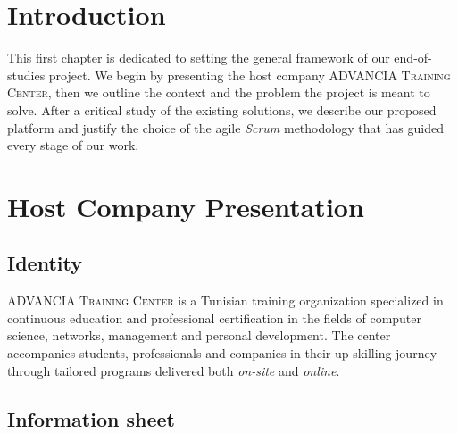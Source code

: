 

\section{Introduction}

This first chapter is dedicated to setting the general framework of our end-of-studies project. We begin by presenting the host company \textsc{ADVANCIA Training Center}, then we outline the context and the problem the project is meant to solve. After a critical study of the existing solutions, we describe our proposed platform and justify the choice of the agile \textit{Scrum} methodology that has guided every stage of our work.

\section{Host Company Presentation}

\subsection{Identity}

\textsc{ADVANCIA Training Center} is a Tunisian training organization specialized in continuous education and professional certification in the fields of computer science, networks, management and personal development. The center accompanies students, professionals and companies in their up-skilling journey through tailored programs delivered both \textit{on-site} and \textit{online}.

\subsection{Information sheet}

